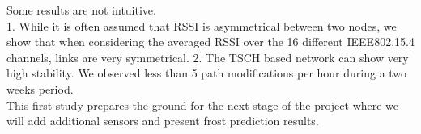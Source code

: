 \documentclass{sig-alternate}
\begin{document}
Some results are not intuitive.\\
1. While it is often assumed that RSSI is asymmetrical between two nodes, we show that when considering the averaged RSSI over the 16 different IEEE802.15.4 channels, links are very symmetrical.
2. The TSCH based network can show very high stability.
We observed less than 5 path modifications per hour during a two weeks period.\\

This first study prepares the ground for the next stage of the project where we will add additional sensors and present frost prediction results.




\end{document}
